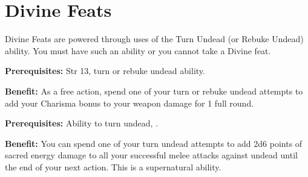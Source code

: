 \section{Divine Feats}

Divine Feats are powered through uses of the Turn Undead (or Rebuke Undead) ability. You must have such an ability or you cannot take a Divine feat.


\textbf{Prerequisites:} Str 13, turn or rebuke undead ability.

\textbf{Benefit:} As a free action, spend one of your turn or rebuke undead attempts to add your Charisma bonus to your weapon damage for 1 full round.


\textbf{Prerequisites:} Ability to turn undead, .

\textbf{Benefit:} You can spend one of your turn undead attempts to add 2d6 points of sacred energy damage to all your successful melee attacks against undead until the end of your next action. This is a supernatural ability.